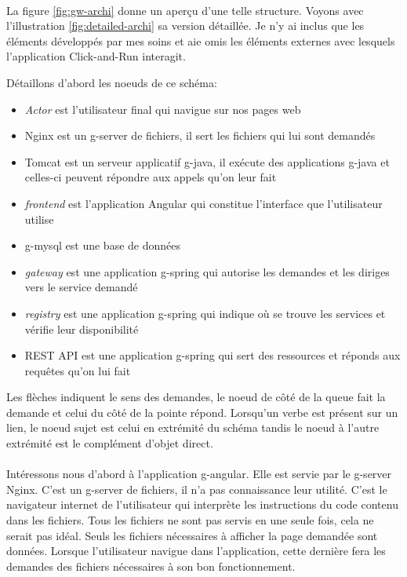 \paragraph{}
La figure \ref{fig:gw-archi} donne un aperçu d'une telle structure.
Voyons avec l'illustration \ref{fig:detailed-archi} sa version détaillée. Je n'y ai inclus que les éléments développés par mes soins et aie omis les éléments externes avec lesquels l'application Click-and-Run interagit.

Détaillons d'abord les noeuds de ce schéma:
\begin{itemize}
    \item \textit{Actor} est l'utilisateur final qui navigue sur nos pages web
    \item Nginx est un \gls{g-server} de fichiers, il sert les fichiers qui lui sont demandés
    \item Tomcat est un serveur applicatif \gls{g-java}, il exécute des applications \gls{g-java} et celles-ci peuvent répondre aux appels qu'on leur fait
    \item \textit{frontend} est l'application Angular qui constitue l'interface que l'utilisateur utilise
    \item \gls{g-mysql} est une base de données
    \item \textit{gateway} est une application \gls{g-spring} qui autorise les demandes et les diriges vers le service demandé
    \item \textit{registry} est une application \gls{g-spring} qui indique où se trouve les services et vérifie leur disponibilité
    \item REST API est une application \gls{g-spring} qui sert des ressources et réponds aux requêtes qu'on lui fait
\end{itemize}
Les flèches indiquent le sens des demandes, le noeud de côté de la queue fait la demande et celui du côté de la pointe répond.
Lorsqu'un verbe est présent sur un lien, le noeud sujet est celui en extrémité du schéma tandis le noeud à l'autre extrémité est le complément d'objet direct.

\paragraph{}
Intéressons nous d'abord à l'application \gls{g-angular}.
Elle est servie par le \gls{g-server} Nginx.
C'est un \gls{g-server} de fichiers, il n'a pas connaissance leur utilité.
C'est le navigateur internet de l'utilisateur qui interprète les instructions du code contenu dans les fichiers.
Tous les fichiers ne sont pas servis en une seule fois, cela ne serait pas idéal.
Seuls les fichiers nécessaires à afficher la page demandée sont données.
Lorsque l'utilisateur navigue dans l'application, cette dernière fera les demandes des fichiers nécessaires à son bon fonctionnement.

